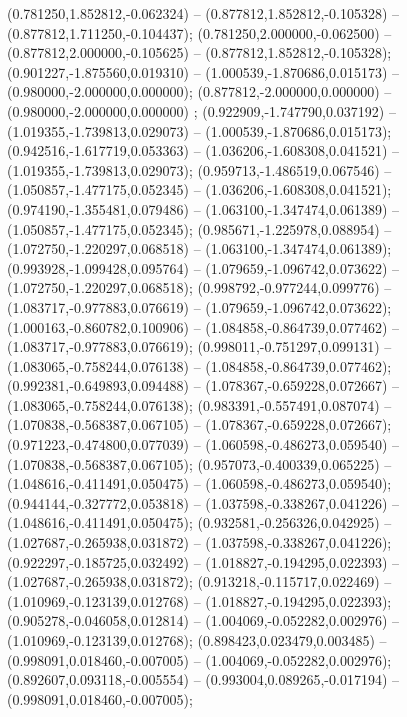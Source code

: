  (0.781250,1.852812,-0.062324) -- (0.877812,1.852812,-0.105328) -- (0.877812,1.711250,-0.104437);
 (0.781250,2.000000,-0.062500) -- (0.877812,2.000000,-0.105625) -- (0.877812,1.852812,-0.105328);
 (0.901227,-1.875560,0.019310) -- (1.000539,-1.870686,0.015173) -- (0.980000,-2.000000,0.000000);
 (0.877812,-2.000000,0.000000) -- (0.980000,-2.000000,0.000000) ;
 (0.922909,-1.747790,0.037192) -- (1.019355,-1.739813,0.029073) -- (1.000539,-1.870686,0.015173);
 (0.942516,-1.617719,0.053363) -- (1.036206,-1.608308,0.041521) -- (1.019355,-1.739813,0.029073);
 (0.959713,-1.486519,0.067546) -- (1.050857,-1.477175,0.052345) -- (1.036206,-1.608308,0.041521);
 (0.974190,-1.355481,0.079486) -- (1.063100,-1.347474,0.061389) -- (1.050857,-1.477175,0.052345);
 (0.985671,-1.225978,0.088954) -- (1.072750,-1.220297,0.068518) -- (1.063100,-1.347474,0.061389);
 (0.993928,-1.099428,0.095764) -- (1.079659,-1.096742,0.073622) -- (1.072750,-1.220297,0.068518);
 (0.998792,-0.977244,0.099776) -- (1.083717,-0.977883,0.076619) -- (1.079659,-1.096742,0.073622);
 (1.000163,-0.860782,0.100906) -- (1.084858,-0.864739,0.077462) -- (1.083717,-0.977883,0.076619);
 (0.998011,-0.751297,0.099131) -- (1.083065,-0.758244,0.076138) -- (1.084858,-0.864739,0.077462);
 (0.992381,-0.649893,0.094488) -- (1.078367,-0.659228,0.072667) -- (1.083065,-0.758244,0.076138);
 (0.983391,-0.557491,0.087074) -- (1.070838,-0.568387,0.067105) -- (1.078367,-0.659228,0.072667);
 (0.971223,-0.474800,0.077039) -- (1.060598,-0.486273,0.059540) -- (1.070838,-0.568387,0.067105);
 (0.957073,-0.400339,0.065225) -- (1.048616,-0.411491,0.050475) -- (1.060598,-0.486273,0.059540);
 (0.944144,-0.327772,0.053818) -- (1.037598,-0.338267,0.041226) -- (1.048616,-0.411491,0.050475);
 (0.932581,-0.256326,0.042925) -- (1.027687,-0.265938,0.031872) -- (1.037598,-0.338267,0.041226);
 (0.922297,-0.185725,0.032492) -- (1.018827,-0.194295,0.022393) -- (1.027687,-0.265938,0.031872);
 (0.913218,-0.115717,0.022469) -- (1.010969,-0.123139,0.012768) -- (1.018827,-0.194295,0.022393);
 (0.905278,-0.046058,0.012814) -- (1.004069,-0.052282,0.002976) -- (1.010969,-0.123139,0.012768);
 (0.898423,0.023479,0.003485) -- (0.998091,0.018460,-0.007005) -- (1.004069,-0.052282,0.002976);
 (0.892607,0.093118,-0.005554) -- (0.993004,0.089265,-0.017194) -- (0.998091,0.018460,-0.007005);
